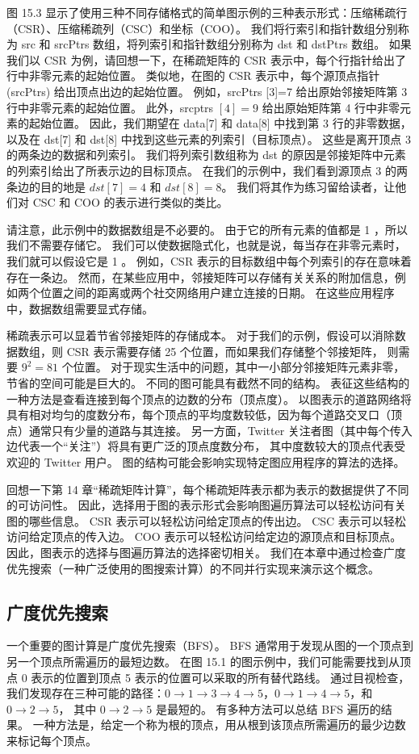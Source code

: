 图 15.3 显示了使用三种不同存储格式的简单图示例的三种表示形式：压缩稀疏行（CSR）、压缩稀疏列（CSC）和坐标（COO）。 
我们将行索引和指针数组分别称为 src 和 srcPtrs 数组，将列索引和指针数组分别称为 dst 和 dstPtrs 数组。 
如果我们以 CSR 为例，请回想一下，在稀疏矩阵的 CSR 表示中，每个行指针给出了行中非零元素的起始位置。 
类似地，在图的 CSR 表示中，每个源顶点指针 (srcPtrs) 给出顶点出边的起始位置。 
例如，srcPtrs [3]=7 给出原始邻接矩阵第 3 行中非零元素的起始位置。 
此外，srcptrs $[4]=9$ 给出原始矩阵第 4 行中非零元素的起始位置。 
因此，我们期望在 data[7] 和 data[8] 中找到第 3 行的非零数据，
以及在 dst[7] 和 dst[8] 中找到这些元素的列索引（目标顶点）。 这些是离开顶点 3 的两条边的数据和列索引。 
我们将列索引数组称为 dst 的原因是邻接矩阵中元素的列索引给出了所表示边的目标顶点。 
在我们的示例中，我们看到源顶点 3 的两条边的目的地是 $d s t[7]=4$ 和 $d s t[8]=8$。 
我们将其作为练习留给读者，让他们对 CSC 和 COO 的表示进行类似的类比。

请注意，此示例中的数据数组是不必要的。 由于它的所有元素的值都是 1 ，所以我们不需要存储它。 
我们可以使数据隐式化，也就是说，每当存在非零元素时，我们就可以假设它是 1 。 
例如，CSR 表示的目标数组中每个列索引的存在意味着存在一条边。 
然而，在某些应用中，邻接矩阵可以存储有关关系的附加信息，例如两个位置之间的距离或两个社交网络用户建立连接的日期。 
在这些应用程序中，数据数组需要显式存储。

稀疏表示可以显着节省邻接矩阵的存储成本。 
对于我们的示例，假设可以消除数据数组，则 CSR 表示需要存储 25 个位置，而如果我们存储整个邻接矩阵，
则需要 $9^{2}=81$ 个位置。 对于现实生活中的问题，其中一小部分邻接矩阵元素非零，节省的空间可能是巨大的。 
不同的图可能具有截然不同的结构。 表征这些结构的一种方法是查看连接到每个顶点的边数的分布（顶点度）。 
以图表示的道路网络将具有相对均匀的度数分布，每个顶点的平均度数较低，因为每个道路交叉口（顶点）通常只有少量的道路与其连接。 
另一方面，Twitter 关注者图（其中每个传入边代表一个“关注”）将具有更广泛的顶点度数分布，
其中度数较大的顶点代表受欢迎的 Twitter 用户。 图的结构可能会影响实现特定图应用程序的算法的选择。

回想一下第 14 章“稀疏矩阵计算”，每个稀疏矩阵表示都为表示的数据提供了不同的可访问性。 
因此，选择用于图的表示形式会影响图遍历算法可以轻松访问有关图的哪些信息。 CSR 表示可以轻松访问给定顶点的传出边。 
CSC 表示可以轻松访问给定顶点的传入边。 $\mathrm{COO}$ 表示可以轻松访问给定边的源顶点和目标顶点。 
因此，图表示的选择与图遍历算法的选择密切相关。 
我们在本章中通过检查广度优先搜索（一种广泛使用的图搜索计算）的不同并行实现来演示这个概念。

\subsection{广度优先搜索}
一个重要的图计算是广度优先搜索（BFS）。 BFS 通常用于发现从图的一个顶点到另一个顶点所需遍历的最短边数。 
在图 15.1 的图示例中，我们可能需要找到从顶点 0 表示的位置到顶点 5 表示的位置可以采取的所有替代路线。 
通过目视检查，我们发现存在三种可能的路径：$0 \rightarrow 1 \rightarrow 3 \rightarrow 4 \rightarrow 5，0 \rightarrow 1 \rightarrow 4 \rightarrow 5$，和 $0 \rightarrow 2 \rightarrow 5$，
其中 $0 \rightarrow 2 \rightarrow 5$ 是最短的。 有多种方法可以总结 BFS 遍历的结果。 
一种方法是，给定一个称为根的顶点，用从根到该顶点所需遍历的最少边数来标记每个顶点。

